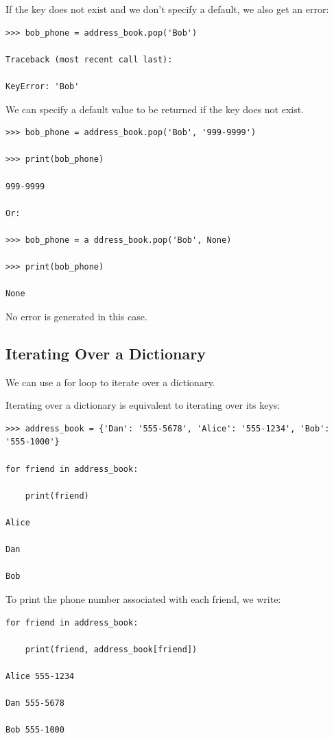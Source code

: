 \documentclass{article}
\begin{document}
If the key does not exist and we don’t specify a default, we also get an error:

\begin{lstlisting}
>>> bob_phone = address_book.pop('Bob')

Traceback (most recent call last):

KeyError: 'Bob'
\end{lstlisting}

We can specify a default value to be returned if the key does not exist.

\begin{lstlisting}
>>> bob_phone = address_book.pop('Bob', '999-9999')

>>> print(bob_phone)

999-9999

Or:

>>> bob_phone = a ddress_book.pop('Bob', None)

>>> print(bob_phone)

None
\end{lstlisting}

No error is generated in this case.

\subsection{Iterating Over a Dictionary}

We can use a  for loop to iterate over a dictionary.

Iterating over a dictionary is equivalent to iterating over its keys:

\begin{lstlisting}
>>> address_book = {'Dan': '555-5678', 'Alice': '555-1234', 'Bob': '555-1000'}

for friend in address_book:

    print(friend)    

Alice

Dan

Bob
\end{lstlisting}

To print the phone number associated with each friend, we write:

\begin{lstlisting}
for friend in address_book:

    print(friend, address_book[friend])    

Alice 555-1234

Dan 555-5678

Bob 555-1000
\end{lstlisting}
\end{document}
